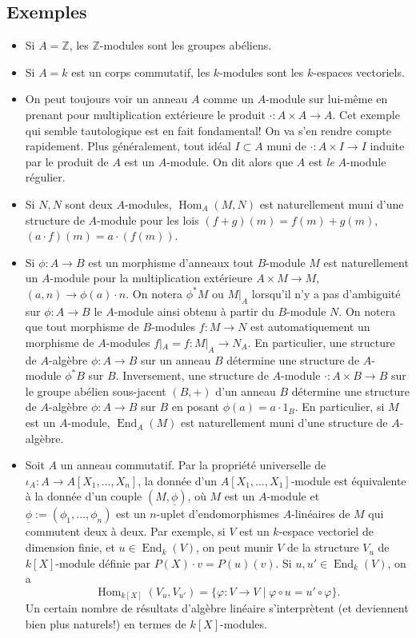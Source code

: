 \documentclass[a4paper, oneside, 12pt]{book}
\theoremstyle{theoremeStyle} %
\theoremstyle{definition} %
\DeclareMathOperator{\SEnd}{End}
\DeclareMathOperator{\SHom}{Hom}
\newcommand{\Z}{\mathbb{Z}}
\begin{document}
 \subsection{Exemples}
\begin{itemize}[leftmargin=* ,parsep=0cm,itemsep=0cm,topsep=0cm]
\item  Si $A=\Z$, les $\Z$-modules sont les groupes abéliens.\\
\item  Si $A=k$ est un corps commutatif, les $k$-modules sont les $k$-espaces vectoriels.\\
\item On peut toujours voir un anneau $A$ comme un $A$-module sur lui-même en prenant pour multiplication extérieure le produit $\cdot:A\times A\rightarrow A$. Cet exemple qui semble tautologique est en fait fondamental! On va s'en rendre compte rapidement. Plus généralement, tout idéal $I\subset A$ muni de $\cdot:A\times I\rightarrow I$ induite par le produit de $A$ est un $A$-module. On dit alors que $A$ est \textit{le} $A$-module régulier.
\item Si $N,N$ sont deux $A$-modules, $\SHom_A(M,N)$ est naturellement muni d'une structure de $A$-module pour les lois $(f+g)(m)=f(m)+g(m)$, $(a\cdot f)(m)=a\cdot (f(m))$.
\item Si $\phi:A\rightarrow B$ est un morphisme d'anneaux tout $B$-module $M$ est naturellement un $A$-module pour la multiplication extérieure $ A\times M\rightarrow M$, $(a,n)\rightarrow \phi(a)\cdot n$. On notera $\phi^*M$ ou $M|_A$ lorsqu'il n'y a pas d'ambiguité sur $\phi:A\rightarrow B$ le $A$-module ainsi obtenu à partir du $B$-module $N$. On notera que tout morphisme de $B$-modules $f:M\rightarrow N$ est automatiquement un morphisme de $A$-modules $f|_A=f:M|_A\rightarrow N_A$. En particulier,  une structure de $A$-algèbre $\phi:A\rightarrow B$ sur un anneau $B$ détermine une structure de $A$-module $\phi^*B$ sur $B$. Inversement, une structure de $A$-module $\cdot:A\times B\rightarrow B$ sur le   groupe abélien sous-jacent $(B,+)$ d'un anneau  $B$ détermine une structure de $A$-algèbre $\phi:A\rightarrow B$ sur $B$ en posant $\phi(a)=a\cdot 1_B$. En particulier, si $M$ est un $A$-module, $\SEnd_A(M)$ est naturellement muni d'une structure de $A$-algèbre.
\item Soit $A$ un anneau commutatif. Par la propriété universelle de $\iota_A:A\rightarrow A[X_1,\dots, X_n]$, la donnée d'un $A[X_1,\dots,X_1]$-module est équivalente à la donnée d'un couple $(M,\underline{\phi})$, où $M$ est un $A$-module et $\underline{\phi}:=(\phi_{1},\dots,\phi_{n})$ est un $n$-uplet d'endomorphismes $A$-linéaires de $M$ qui commutent deux à deux. Par exemple, si $V$ est un $k$-espace vectoriel de dimension finie, et $u\in \SEnd_k(V)$, on peut munir $V$ de la structure $V_u$ de $k[X]$-module définie par $P(X)\cdot v=P(u)(v)$. Si $u,u'\in\SEnd_k(V) $, on a
$$\SHom_{k[X]}(V_u,V_{u'})=\lbrace \varphi:V\rightarrow V\; |\; \varphi\circ u=u'\circ \varphi\rbrace.$$
Un certain nombre de résultats d'algèbre linéaire s'interprètent (et deviennent bien plus naturels!) en termes de $k[X]$-modules.\\
\end{itemize}
\end{document}
